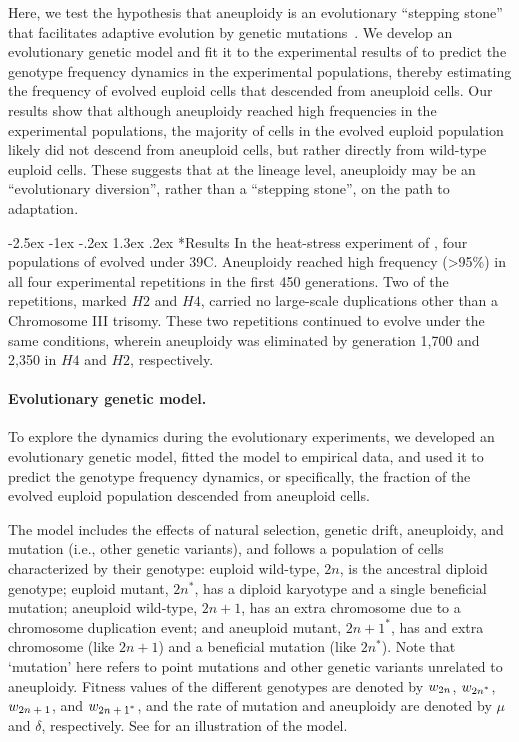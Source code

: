 \documentclass[12pt]{article}
\makeatletter
\renewcommand\section{\@startsection {section}{1}{\z@}%
     {-2.5ex \@plus -1ex \@minus -.2ex}%
     {1.3ex \@plus.2ex}%
    {\Large\bfseries}}
\newcommand{\euwt}{\emph{$2n$}}
\newcommand{\anwt}{\emph{$2n+1$}}
\newcommand{\eumt}{\emph{$2n^*$}}
\newcommand{\anmt}{\emph{$2n+1^*$}}
\makeatother
\begin{document}
Here, we test the hypothesis that aneuploidy is an evolutionary ``stepping stone'' that facilitates adaptive evolution by genetic mutations~\citep{Yona2012}.
We develop an evolutionary genetic model and fit it to the experimental results of \citet{Yona2012} to predict the genotype frequency dynamics in the experimental populations, thereby estimating the frequency of evolved euploid cells that descended from aneuploid cells. 
Our results show that although aneuploidy reached high frequencies in the experimental populations, the majority of cells in the evolved euploid population likely did not descend from aneuploid cells, but rather directly from wild-type euploid cells.
These suggests that at the lineage level, aneuploidy may be an ``evolutionary diversion'', rather than a ``stepping stone'', on the path to adaptation.


\section*{Results}
In the heat-stress experiment of \citet{Yona2012}, four populations of \yeast evolved under 39\degree C.
Aneuploidy reached high frequency (>95\%) in all four experimental repetitions in the first 450 generations.
Two of the repetitions, marked $H2$ and $H4$, carried no large-scale duplications other than a Chromosome III trisomy.
These two repetitions continued to evolve under the same conditions, wherein aneuploidy was eliminated by generation 1,700 and 2,350 in $H4$ and $H2$, respectively.


\paragraph{Evolutionary genetic model.} 
To explore the dynamics during the evolutionary experiments, we developed an evolutionary genetic model, fitted the model to empirical data, and used it to predict the genotype frequency dynamics, or specifically, the fraction of the evolved euploid population descended from aneuploid cells. 

The model includes the effects of natural selection, genetic drift, aneuploidy, and mutation (i.e., other genetic variants), and follows a population of cells characterized by their genotype: 
euploid wild-type, \euwt, is the ancestral diploid genotype; 
euploid mutant, \eumt, has a diploid karyotype and a single beneficial mutation; 
aneuploid wild-type, \anwt, has an extra chromosome due to a chromosome duplication event; and
aneuploid mutant, \anmt, has and extra chromosome (like \anwt) and a beneficial mutation (like \eumt).
Note that `mutation' here refers to point mutations and other genetic variants unrelated to aneuploidy.
Fitness values of the different genotypes are denoted by $w_{\euwt}$, $w_{\eumt}$, $w_{\anwt}$, and $w_{\anmt}$, and the rate of mutation and aneuploidy are denoted by $\mu$ and $\delta$, respectively.
See  for an illustration of the model.
\end{document}
